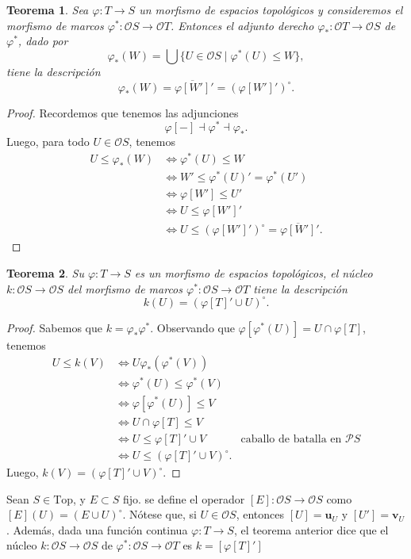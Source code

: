 \documentclass[12pt,letterpaper,titlepage]{article}
\newtheorem{thm}{Teorema}
\theoremstyle{definition}
\newcommand\ol[1]{\overline{#1}}
\renewcommand\phi{\varphi}
\renewcommand\cal[1]{\mathcal{#1}}
\newcommand\unuc[1]{\mathbf u_{#1}}
\newcommand\vnuc[1]{\mathbf v_{#1}}
\newcommand\<{\langle}
\renewcommand\>{\rangle}
\newcommand{\Top}{\mathrm{Top}}
\begin{document}
\begin{thm}
  Sea $\phi:T\to S$ un morfismo de espacios topológicos y
  consideremos el morfismo de marcos
  $\phi^*:\cal OS\to\cal OT$.
  Entonces el adjunto derecho $\phi_*:\cal OT \to \cal OS$
  de $\phi^*$, dado por
  \[
    \phi_*(W)
    = \bigcup\{U\in\cal OS \mid \phi^*(U) \leq W\}
  ,\]
  tiene la descripción
  \[
    \phi_*(W) = \ol{\phi[W']}' = (\phi[W']')^\circ
  .\]
\end{thm}
\begin{proof}
    Recordemos que tenemos las adjunciones
    \[
        \phi[-]\dashv \phi^* \dashv \phi_*
    .\]
    Luego, para todo $U\in\cal OS$, tenemos
    \begin{align*}
        U\leq \phi_*(W)
        &\iff \phi^*(U)\leq W \\
        &\iff W'\leq \phi^*(U)' = \phi^*(U') \\
        &\iff \phi[W'] \leq U' \\
        &\iff U\leq \phi[W']' \\
        &\iff U\leq (\phi[W']')^\circ = \ol{\phi[W']}'.
    \end{align*}
\end{proof}

\begin{thm}
  Su $\phi:T\to S$ es un morfismo de espacios topológicos,
  el núcleo $k:\cal OS\to\cal OS$ del morfismo de marcos
  $\phi^*:\cal OS\to\cal OT$ tiene la descripción
  \[
    k(U) = (\phi[T]' \cup U)^\circ
  .\]
\end{thm}
\begin{proof}
    Sabemos que $k=\phi_*\phi^*$.
    Observando que $\phi[\phi^*(U)]=U\cap\phi[T]$, tenemos
    \begin{align*}
        U\leq k(V)
        &\iff U \phi_*(\phi^*(V)) \\
        &\iff \phi^*(U)\leq\phi^*(V) \\
        &\iff \phi[\phi^*(U)] \leq V \\
        &\iff U\cap \phi[T] \leq V \\
        &\iff U\leq \phi[T]'\cup V
            &\text{caballo de batalla en $\cal PS$} \\
        &\iff U\leq {(\phi[T]'\cup V)}^\circ.
    \end{align*}
    Luego, $k(V)={(\phi[T]'\cup V)}^\circ$.
\end{proof}

Sean $S\in\Top$, y $E\subset S$ fijo. se define el operador $[E]:\cal O S\to \cal O S$ como $[E](U)={(E\cup U)}^{\circ}$.
Nótese que, si $U \in \cal OS$, entonces $[U]=\unuc U$
y $[U']=\vnuc U$.
Además, dada una función continua $\phi:T\to S$,
el teorema anterior dice que el núcleo
$k:\cal OS\to\cal OS$ de $\phi^*:\cal OS\to\cal OT$ es
$k=[\phi[T]']$
\end{document}

